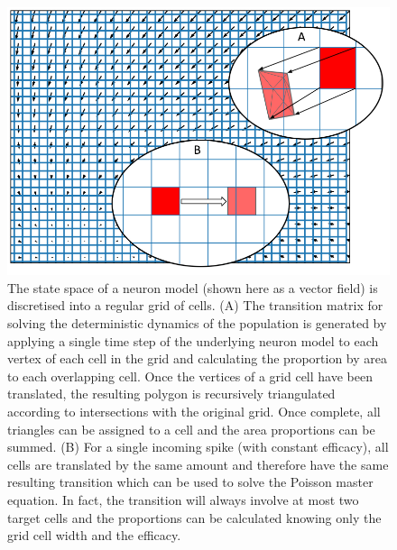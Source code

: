 \documentclass[utf8]{frontiersSCNS} %
\begin{document}
\begin{figure}[!htb]
  \centering
  \includegraphics[width=\columnwidth]{images/grid_method.pdf}
  \caption{The state space of a neuron model (shown here as a vector field) is discretised into a regular grid of cells. (A) The transition matrix for solving the deterministic dynamics of the population is generated by applying a single time step of the underlying neuron model to each vertex of each cell in the grid and calculating the proportion by area to each overlapping cell. Once the vertices of a grid cell have been translated, the resulting polygon is recursively triangulated according to intersections with the original grid. Once complete, all triangles can be assigned to a cell and the area proportions can be summed. (B) For a single incoming spike (with constant efficacy), all cells are translated by the same amount and therefore have the same resulting transition which can be used to solve the Poisson master equation. In fact, the transition will always involve at most two target cells and the proportions can be calculated knowing only the grid cell width and the efficacy.}
  \label{fig:grid}
\end{figure}
\end{document}
